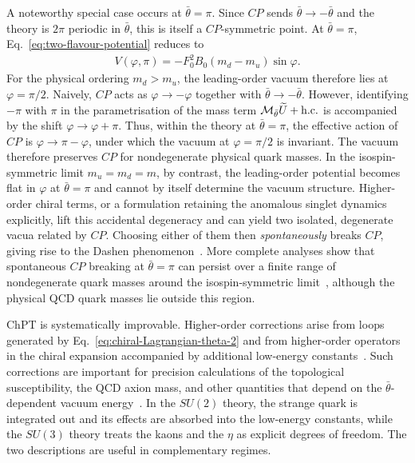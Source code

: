\documentclass[review]{elsarticle}
\numberwithin{equation}{section}
\numberwithin{table}{section}
\numberwithin{figure}{section}
\def\M{\mathcal{M}}
\def\hc{{\rm h.c.}}
\begin{document}
A noteworthy special case occurs at $\bar\theta=\pi$. Since $CP$ sends $\bar\theta\to-\bar\theta$ and the theory is $2\pi$ periodic in $\bar\theta$, this is itself a $CP$-symmetric point. At $\bar\theta=\pi$, Eq.~\eqref{eq:two-flavour-potential} reduces to
\begin{align}
    V(\varphi,\pi) = -F_0^2B_0(m_d-m_u)\sin\varphi .
\end{align}
For the physical ordering $m_d>m_u$, the leading-order vacuum therefore lies at $\varphi=\pi/2$. Naively, $CP$ acts as $\varphi\to-\varphi$ together with $\bar\theta\to-\bar\theta$. However, identifying $-\pi$ with $\pi$ in the parametrisation of the mass term $\M_{\bar\theta}\widetilde U+\hc$ is accompanied by the shift $\varphi\to\varphi+\pi$. Thus, within the theory at $\bar\theta=\pi$, the effective action of $CP$ is
$\varphi\to\pi-\varphi$, under which the vacuum at $\varphi=\pi/2$ is invariant. The vacuum therefore preserves $CP$ for nondegenerate physical quark masses. In the isospin-symmetric limit $m_u=m_d=m$, by contrast, the leading-order potential becomes flat in $\varphi$ at $\bar\theta=\pi$ and cannot by itself determine the vacuum structure. Higher-order chiral terms, or a formulation retaining the anomalous singlet dynamics explicitly, lift this accidental degeneracy and can yield two isolated, degenerate vacua related by $CP$. Choosing either of them then {\it spontaneously} breaks $CP$, giving rise to the Dashen phenomenon~\cite{Dashen:1970et,Leutwyler:1992yt,Smilga:1998dh}. More complete analyses show that spontaneous $CP$ breaking at $\bar\theta=\pi$ can persist over a finite range of nondegenerate quark masses around the isospin-symmetric limit~\cite{Creutz:2003xu}, although the physical QCD quark masses lie outside this region.

ChPT is systematically improvable. Higher-order corrections arise from loops generated by Eq.~\eqref{eq:chiral-Lagrangian-theta-2} and from higher-order operators in the chiral expansion accompanied by additional low-energy constants~\cite{Gasser:1983yg,Gasser:1984gg}. Such corrections are important for precision calculations of the topological susceptibility, the QCD axion mass, and other quantities that depend on the $\bar\theta$-dependent vacuum energy~\cite{GrilliDiCortona:2015jxo,DiLuzio:2020wdo}. In the $SU(2)$ theory, the strange quark is integrated out and its effects are absorbed into the low-energy constants, while the $SU(3)$ theory treats the kaons and the $\eta$ as explicit degrees of freedom. The two descriptions are useful in complementary regimes.
\end{document}
